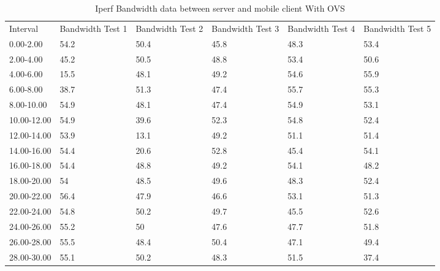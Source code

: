 \begin{sidewaystable}[]
	\centering
	\caption{Iperf Bandwidth data between server and mobile client With OVS}
	\label{tab:iperf_server_mob_with_ovs}
	\begin{tabular}{llllll}
		Interval    & Bandwidth Test 1 & Bandwidth Test 2 & Bandwidth Test 3 & Bandwidth Test 4 & Bandwidth Test 5 \\
		0.00-2.00   & 54.2             & 50.4             & 45.8             & 48.3             & 53.4             \\
		2.00-4.00   & 45.2             & 50.5             & 48.8             & 53.4             & 50.6             \\
		4.00-6.00   & 15.5             & 48.1             & 49.2             & 54.6             & 55.9             \\
		6.00-8.00   & 38.7             & 51.3             & 47.4             & 55.7             & 55.3             \\
		8.00-10.00  & 54.9             & 48.1             & 47.4             & 54.9             & 53.1             \\
		10.00-12.00 & 54.9             & 39.6             & 52.3             & 54.8             & 52.4             \\
		12.00-14.00 & 53.9             & 13.1             & 49.2             & 51.1             & 51.4             \\
		14.00-16.00 & 54.4             & 20.6             & 52.8             & 45.4             & 54.1             \\
		16.00-18.00 & 54.4             & 48.8             & 49.2             & 54.1             & 48.2             \\
		18.00-20.00 & 54               & 48.5             & 49.6             & 48.3             & 52.4             \\
		20.00-22.00 & 56.4             & 47.9             & 46.6             & 53.1             & 51.3             \\
		22.00-24.00 & 54.8             & 50.2             & 49.7             & 45.5             & 52.6             \\
		24.00-26.00 & 55.2             & 50               & 47.6             & 47.7             & 51.8             \\
		26.00-28.00 & 55.5             & 48.4             & 50.4             & 47.1             & 49.4             \\
		28.00-30.00 & 55.1             & 50.2             & 48.3             & 51.5             & 37.4             \\

\end{tabular}
\end{sidewaystable}
